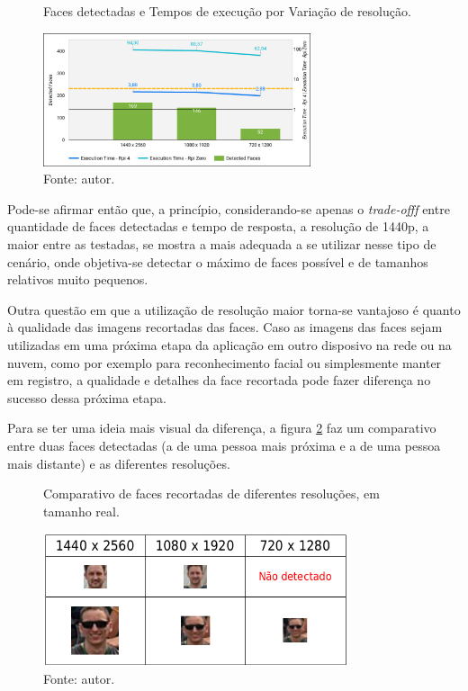 \begin{figure}[h]
    \centering
    \caption[Faces detectadas e Tempos de execução por Variação de resolução.]{Faces detectadas e Tempos de execução por Variação de resolução.}
    \includegraphics[width=0.7\textwidth]{Cap4_Experimentos_Realizados/Figures/cena1_graficos_variacao_resolucao.jpg}
    \caption*{Fonte: autor.}
    \label{fig:cena1_graficos_variacao_resolucao}
\end{figure}

Pode-se afirmar então que, a princípio, considerando-se apenas o \emph{trade-offf} entre quantidade de faces detectadas e tempo de resposta, a resolução de 1440p, a maior entre as  testadas, se mostra a mais adequada a se utilizar nesse tipo de cenário, onde objetiva-se detectar o máximo de faces possível e de tamanhos relativos muito pequenos.

Outra questão em que a utilização de resolução maior torna-se vantajoso é quanto à qualidade das imagens recortadas das faces. Caso as imagens das faces sejam utilizadas em uma próxima etapa da aplicação em outro disposivo na rede ou na nuvem, como por exemplo para reconhecimento facial ou simplesmente manter em registro, a qualidade e detalhes da face recortada pode fazer diferença no sucesso dessa próxima etapa.

Para se ter uma ideia mais visual da diferença, a figura \ref{fig:cena1_comparativo_qualidade_faces} faz um comparativo entre duas faces detectadas (a de uma pessoa mais próxima e a de uma pessoa mais distante) e as diferentes resoluções.

\begin{figure}[h]
    \centering
    \caption[Comparativo de faces recortadas de diferentes resoluções, em tamanho real.]{Comparativo de faces recortadas de diferentes resoluções, em tamanho real.}
    \includegraphics[width=0.8\textwidth]{Cap4_Experimentos_Realizados/Figures/cena1_comparativo_qualidade_faces_recortadas.jpg}
    \caption*{Fonte: autor.}
    \label{fig:cena1_comparativo_qualidade_faces}
\end{figure}

